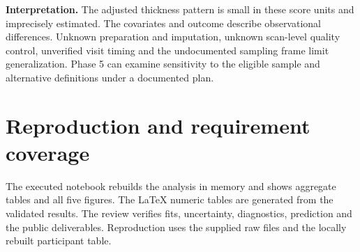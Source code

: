 \documentclass[11pt]{article}
\begin{document}
\textbf{Interpretation.} The adjusted thickness pattern is small in these score units and imprecisely estimated. The covariates and outcome describe observational differences. Unknown preparation and imputation, unknown scan-level quality control, unverified visit timing and the undocumented sampling frame limit generalization. Phase 5 can examine sensitivity to the eligible sample and alternative definitions under a documented plan.

\clearpage
\section{Reproduction and requirement coverage}\label{sec:audit}
The executed notebook rebuilds the analysis in memory and shows aggregate tables and all five figures. The LaTeX numeric tables are generated from the validated results. The review verifies fits, uncertainty, diagnostics, prediction and the public deliverables. Reproduction uses the supplied raw files and the locally rebuilt participant table.
\end{document}
